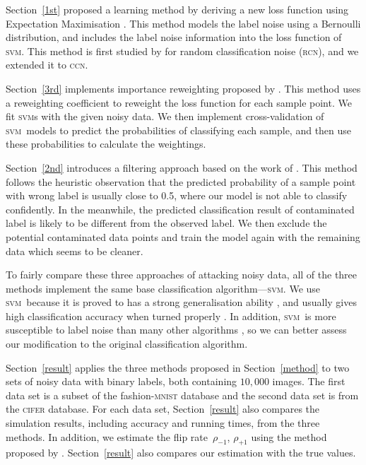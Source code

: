 \documentclass[12pt]{article} %
\newcommand{\svm}{\textsc{svm}}
\newcommand{\rhoo}{\rho_{+1}}
\newcommand{\rhoz}{\rho_{-1}}
\begin{document}
Section~\ref{1st} proposed a learning method by deriving a new loss function using Expectation Maximisation \citep[p.423]{Bishop:2006:PRM:1162264}. This method models the label noise using a Bernoulli distribution, and includes the label noise information into the loss function of \svm. This method is first studied by \citet{pmlr-v20-biggio11} for random classification noise (\textsc{rcn}), and we extended it to \textsc{ccn}. 

Section~\ref{3rd} implements importance reweighting proposed by \citet{liu2016classification}. This method uses a reweighting coefficient to reweight the loss function for each sample point. We fit \svm s with the given noisy data. We then implement cross-validation of \svm\ models to predict the probabilities of classifying each sample, and then use these probabilities to calculate the weightings.

Section~\ref{2nd} introduces a filtering approach based on the work of \citet{brodley1996identifying}. This method follows the heuristic observation that the predicted probability of a sample point with wrong label is usually close to 0.5, where our model is not able to classify confidently. In the meanwhile, the predicted classification result of contaminated label is likely to be different from the observed label.  We then exclude the potential contaminated data points and train the model again with the remaining data which seems to be cleaner. 

To fairly compare these three approaches of attacking noisy data, all of the three methods implement the same base classification algorithm---\svm. We use \svm\ because it is proved to has a strong generalisation ability \citep{NIPS2012_4500,Seeger:2003:PGE:944919.944929,Cortes1995}, and usually gives high classification accuracy when turned properly \citep{Fernandez-Delgado:2014:WNH:2627435.2697065}. In addition, \svm\ is more susceptible to label noise than many other algorithms \citep{frenay2014classification}, so we can better assess our modification to the original classification algorithm.

Section~\ref{result} applies the three methods proposed in Section~\ref{method} to two sets of noisy data with binary labels, both containing $10,000$ images. The first data set is a subset of the fashion-\textsc{mnist} database and the second data set is from the \textsc{cifer} database. For each data set, Section~\ref{result} also compares the simulation results, including accuracy and running times, from the three methods. In addition, we estimate the flip rate~$\rhoz$, $\rhoo$ using the method proposed by \citet{liu2016classification}. 
Section~\ref{result} also compares our estimation with the true values.
\end{document}
